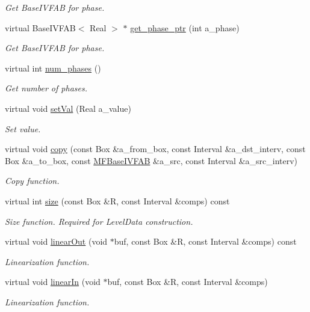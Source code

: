 \begin{DoxyCompactItemize}
\begin{DoxyCompactList}\small\item\em Get Base\+I\+V\+F\+AB for phase. \end{DoxyCompactList}\item 
virtual Base\+I\+V\+F\+AB$<$ Real $>$ $\ast$ \hyperlink{classMFBaseIVFAB_a24a39b22aa3b2161d1a8806759e3ab5d}{get\+\_\+phase\+\_\+ptr} (int a\+\_\+phase)
\begin{DoxyCompactList}\small\item\em Get Base\+I\+V\+F\+AB for phase. \end{DoxyCompactList}\item 
virtual int \hyperlink{classMFBaseIVFAB_ad8b2774ce9428141d1fa7325c908365e}{num\+\_\+phases} ()
\begin{DoxyCompactList}\small\item\em Get number of phases. \end{DoxyCompactList}\item 
virtual void \hyperlink{classMFBaseIVFAB_a4716cc0233325e385773f3e9d88fe694}{set\+Val} (Real a\+\_\+value)
\begin{DoxyCompactList}\small\item\em Set value. \end{DoxyCompactList}\item 
virtual void \hyperlink{classMFBaseIVFAB_a7fd94070e8b3951cc4be562fe44aeff1}{copy} (const Box \&a\+\_\+from\+\_\+box, const Interval \&a\+\_\+dst\+\_\+interv, const Box \&a\+\_\+to\+\_\+box, const \hyperlink{classMFBaseIVFAB}{M\+F\+Base\+I\+V\+F\+AB} \&a\+\_\+src, const Interval \&a\+\_\+src\+\_\+interv)
\begin{DoxyCompactList}\small\item\em Copy function. \end{DoxyCompactList}\item 
virtual int \hyperlink{classMFBaseIVFAB_ae0ca388210e41175aa1222e3b55d1221}{size} (const Box \&R, const Interval \&comps) const 
\begin{DoxyCompactList}\small\item\em Size function. Required for Level\+Data construction. \end{DoxyCompactList}\item 
virtual void \hyperlink{classMFBaseIVFAB_a1fa6b9ec37b96ec3db7ee55e1b616f2d}{linear\+Out} (void $\ast$buf, const Box \&R, const Interval \&comps) const 
\begin{DoxyCompactList}\small\item\em Linearization function. \end{DoxyCompactList}\item 
virtual void \hyperlink{classMFBaseIVFAB_a9bba2feb684711810719261c32d5e441}{linear\+In} (void $\ast$buf, const Box \&R, const Interval \&comps)
\begin{DoxyCompactList}\small\item\em Linearization function. \end{DoxyCompactList}\end{DoxyCompactItemize}
